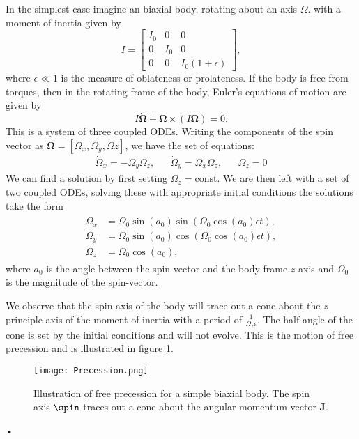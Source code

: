 In the simplest case imagine an biaxial body,
rotating about an axis $\Omega$. with a moment of inertia given by
\begin{equation}
    I = \left[\begin{array}{ccc}
            I_{0} & 0 & 0 \\
            0 & I_{0} & 0 \\
            0 & 0 & I_{0}(1 + \epsilon)
            \end{array}\right],
\end{equation}
where $\epsilon \ll 1$ is the measure of oblateness or prolateness.  If the
body is free from torques, then in the rotating frame of the body, Euler's
equations of motion \citep{Landau1969} are given by
\begin{equation}
    I\dot{\bm{\Omega}} + \bm{\Omega} \times \left(I\bm{\Omega}\right)=0.
\end{equation}
This is a system of three coupled ODEs. Writing the components of the spin
vector as $\bm{\Omega} = [\Omega_{x}, \Omega_{y}, \Omega{z}]$, we have the
set of equations:
\begin{align}
\dot{\Omega}_x = -\Omega_y\Omega_z, &&
\dot{\Omega}_y = \Omega_x \Omega_z, &&
\dot{\Omega}_z = 0
\end{align}
We can find a solution by first setting $\Omega_{z}=\mathrm{const}$.
We are then left with a set of
two coupled ODEs, solving these with appropriate initial conditions
the solutions take the form
\begin{align}
\begin{split}
    \Omega_{x} & = \Omega_{0}\sin(a_0)\sin\left(\Omega_{0}\cos(a_0)\epsilon t\right), \\
    \Omega_{y} & = \Omega_{0}\sin(a_0)\cos\left(\Omega_{0}\cos(a_0)\epsilon t\right),\\
    \Omega_{z} & = \Omega_0 \cos(a_0),
\label{eqn: free precession}
\end{split}
\end{align}
where $a_0$ is the angle between the spin-vector and the body frame $z$ axis and
$\Omega_0$ is the magnitude of the spin-vector.

We observe that the spin axis of the body will trace out a cone about the $z$
principle axis of the moment of inertia with a period of
$\frac{1}{\Omega_{z}\epsilon}$.  The half-angle of the cone is set by the
initial conditions and will not evolve. This is the motion of free precession
and is illustrated in figure \ref{fig: precession}.
\begin{figure}[htb]
\centering
\texttt{[image: Precession.png]}
\caption{Illustration of free precession for a simple biaxial body. The spin
    axis $\spin$ traces out a cone about the angular momentum vector $\mathbf{J}$.}
\label{fig: precession}
\end{figure}•

